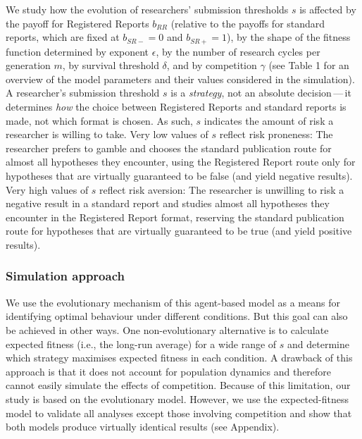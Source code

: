 \documentclass[
  ,man,mask,floatsintext]{apa6}
\begin{document}
We study how the evolution of researchers' submission thresholds \(s\) is affected by the payoff for Registered Reports \(b_{RR}\) (relative to the payoffs for standard reports, which are fixed at \(b_{SR-} = 0\) and \(b_{SR+} = 1\)), by the shape of the fitness function determined by exponent \(\epsilon\), by the number of research cycles per generation \(m\), by survival threshold \(\delta\), and by competition \(\gamma\) (see Table 1 for an overview of the model parameters and their values considered in the simulation).
A researcher's submission threshold \(s\) is a \emph{strategy}, not an absolute decision\(\,\)---\(\,\)it determines \emph{how} the choice between Registered Reports and standard reports is made, not which format is chosen.
As such, \(s\) indicates the amount of risk a researcher is willing to take.
Very low values of \(s\) reflect risk proneness:
The researcher prefers to gamble and chooses the standard publication route for almost all hypotheses they encounter, using the Registered Report route only for hypotheses that are virtually guaranteed to be false (and yield negative results).
Very high values of \(s\) reflect risk aversion:
The researcher is unwilling to risk a negative result in a standard report and studies almost all hypotheses they encounter in the Registered Report format, reserving the standard publication route for hypotheses that are virtually guaranteed to be true (and yield positive results).

\hypertarget{simulation-approach}{%
\subsubsection{Simulation approach}\label{simulation-approach}}

We use the evolutionary mechanism of this agent-based model as a means for identifying optimal behaviour under different conditions.
But this goal can also be achieved in other ways.
One non-evolutionary alternative is to calculate expected fitness (i.e., the long-run average) for a wide range of \(s\) and determine which strategy maximises expected fitness in each condition.
A drawback of this approach is that it does not account for population dynamics and therefore cannot easily simulate the effects of competition.
Because of this limitation, our study is based on the evolutionary model.
However, we use the expected-fitness model to validate all analyses except those involving competition and show that both models produce virtually identical results (see Appendix).
\end{document}
